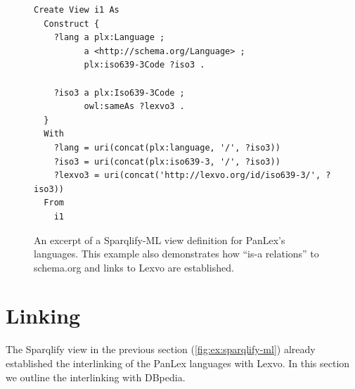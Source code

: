 \documentclass[sw]{iosart2c}
\begin{document}
\begin{figure}
\centering
\begin{lstlisting}[basicstyle=\footnotesize\ttfamily]
Create View i1 As
  Construct {
    ?lang a plx:Language ;
          a <http://schema.org/Language> ;
          plx:iso639-3Code ?iso3 .

    ?iso3 a plx:Iso639-3Code ;
          owl:sameAs ?lexvo3 .
  }
  With
    ?lang = uri(concat(plx:language, '/', ?iso3))
    ?iso3 = uri(concat(plx:iso639-3, '/', ?iso3))
    ?lexvo3 = uri(concat('http://lexvo.org/id/iso639-3/', ?iso3))
  From
    i1
\end{lstlisting}
\caption{An excerpt of a Sparqlify-ML view definition for PanLex's languages. This
example also demonstrates how ``is-a relations'' to schema.org and links to Lexvo are established.}
\label{fig:ex:sparqlify-ml}
\end{figure}


\section{Linking}
\label{sec:linking}
The Sparqlify view in the previous section (\autoref{fig:ex:sparqlify-ml}) already
established the interlinking of the PanLex languages with Lexvo.
In this section we outline the interlinking with DBpedia.

\end{document}
